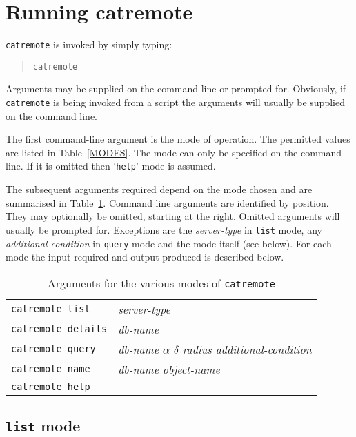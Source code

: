 \documentclass[twoside,11pt]{article}
\newcommand{\xlabel}[1]{}
\renewcommand{\_}{\texttt{\symbol{95}}}
\begin{document}
\section{\xlabel{RUN}\label{RUN}Running catremote}

{\tt catremote} is invoked by simply typing:

\begin{quote}
{\tt catremote}
\end{quote}

Arguments may be supplied on the command line or prompted for.  Obviously,
if {\tt catremote} is being invoked from a script the arguments will
usually be supplied on the command line.

The first command-line argument is the mode of operation.  The permitted
values are listed in Table~\ref{MODES}.  The mode can only be specified on
the command line.  If it is omitted then `{\tt help}' mode is assumed.

The subsequent arguments required depend on the mode chosen and are
summarised in Table~\ref{ARGS}.  Command line arguments are identified
by position.  They may optionally be omitted, starting at the right.
Omitted arguments will usually be prompted for.  Exceptions are the
{\it server-type}\/ in {\tt list} mode, any {\it additional-condition}\/
in {\tt query} mode and the mode itself (see below).  For each mode the
input required and output produced is described below.

\begin{table}[htbp]

\begin{center}
\begin{tabular}{ll}
{\tt catremote list}    & {\it server-type} \\
{\tt catremote details} & {\it db-name} \\
{\tt catremote query}   & {\it db-name $\alpha$ $\delta$ radius
    additional-condition} \\
{\tt catremote name}    & {\it db-name object-name} \\
{\tt catremote help}    & \\
\end{tabular}
\end{center}

\caption{Arguments for the various modes of {\tt catremote}
\label{ARGS} }

\end{table}

\subsection{{\tt list} mode}
\end{document}
